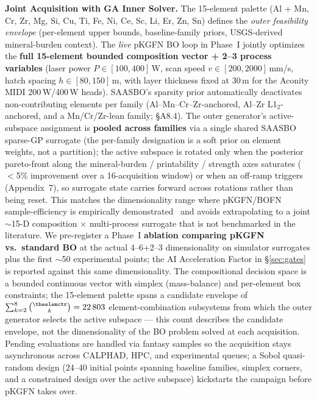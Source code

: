 \documentclass[11pt,letterpaper]{article}
\newcommand{\kmin}{2}                    %
\newcommand{\kmax}{8}                    %
\newcounter{elemctr}
\newcommand{\elementcount}{\theelemctr}  %
\newcommand{\subsystemcount}{22\,803}    %
\begin{document}
\textbf{Joint Acquisition with GA Inner Solver.}
The 15-element palette (Al + Mn, Cr, Zr, Mg, Si, Cu, Ti, Fe, Ni, Ce, Sc, Li,
Er, Zn, Sn) defines the \emph{outer feasibility envelope} (per-element
upper bounds, baseline-family priors, USGS-derived mineral-burden
context). The \emph{live} pKGFN BO loop in Phase~I jointly optimizes the
\textbf{full 15-element bounded composition vector + 2--3 process variables} (laser
power $P\in[100,400]$\,W, scan speed $v\in[200,2000]$\,mm/s, hatch
spacing $h\in[80,150]$\,\textmu m, with layer thickness fixed at
30\,\textmu m for the Aconity MIDI 200\,W/400\,W heads). SAASBO's
sparsity prior automatically deactivates non-contributing elements per
family
(Al--Mn--Cr--Zr-anchored, Al--Zr L1$_2$-anchored, and a Mn/Cr/Zr-lean
family; \S A8.4). The outer generator's active-subspace assignment is
\textbf{pooled across families} via a single shared SAASBO sparse-GP
surrogate (the per-family designation is a soft prior on element
weights, not a partition); the active subspace is rotated only when the
posterior pareto-front along the mineral-burden / printability /
strength axes saturates ($<$5\% improvement over a 16-acquisition
window) or when an off-ramp triggers (Appendix~7), so surrogate state
carries forward across rotations rather than being reset. This
matches the dimensionality range where pKGFN/BOFN
sample-efficiency is empirically demonstrated~\cite{buathong_2023_23110214,buathong_2025_25061145}
and avoids extrapolating to a joint $\sim$15-D composition $\times$ multi-process surrogate
that is not benchmarked in the literature. We pre-register a Phase~I
\textbf{ablation comparing pKGFN vs.\ standard BO} at the actual 4--6+2--3
dimensionality on simulator surrogates plus the first $\sim$50 experimental
points; the AI Acceleration Factor in \S\ref{sec:gates} is reported against
this same dimensionality.
The compositional decision space is a bounded continuous vector with
simplex (mass-balance) and per-element box constraints; the 15-element
palette spans a candidate envelope of
$\sum_{k=2}^{8}\binom{\elementcount}{k}=\subsystemcount{}$
element-combination subsystems from which the outer generator selects
the active subspace --- this count describes the candidate envelope, not
the dimensionality of the BO problem solved at each acquisition.
Pending evaluations are handled via fantasy samples so the acquisition
stays asynchronous across CALPHAD, HPC, and experimental queues; a
Sobol quasi-random design (24--40 initial points spanning baseline
families, simplex corners, and a constrained design over the active
subspace) kickstarts the campaign before pKGFN takes over.
\end{document}
